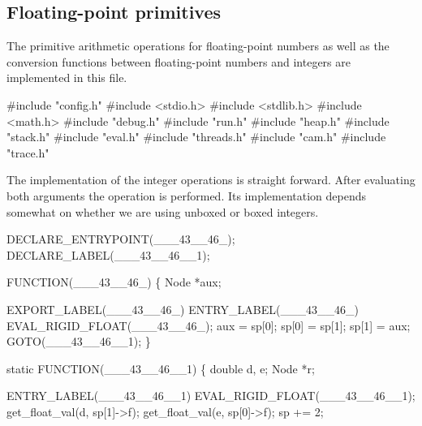 %
%
\subsection{Floating-point primitives}
The primitive arithmetic operations for floating-point numbers as well
as the conversion functions between floating-point numbers and
integers are implemented in this file.

\nwenddocs{}\endmoddef\nwstartdeflinemarkup{}\nwenddeflinemarkup
#include "config.h"
#include <stdio.h>
#include <stdlib.h>
#include <math.h>
#include "debug.h"
#include "run.h"
#include "heap.h"
#include "stack.h"
#include "eval.h"
#include "threads.h"
#include "cam.h"
#include "trace.h"

\nwendcode{}\nwdocspar
The implementation of the integer operations is straight
forward. After evaluating both arguments the operation is
performed. Its implementation depends somewhat on whether we are using
unboxed or boxed integers.

\nwenddocs{}\plusendmoddef\nwstartdeflinemarkup{}\nwenddeflinemarkup
DECLARE_ENTRYPOINT(___43__46_);
DECLARE_LABEL(___43__46__1);

FUNCTION(___43__46_)
\{
    Node *aux;

    EXPORT_LABEL(___43__46_)
 ENTRY_LABEL(___43__46_)
    EVAL_RIGID_FLOAT(___43__46_);
    aux   = sp[0];
    sp[0] = sp[1];
    sp[1] = aux;
    GOTO(___43__46__1);
\}

static
FUNCTION(___43__46__1)
\{
    double d, e;
    Node   *r;

 ENTRY_LABEL(___43__46__1)
    EVAL_RIGID_FLOAT(___43__46__1);
    get_float_val(d, sp[1]->f);
    get_float_val(e, sp[0]->f);
    sp += 2;

